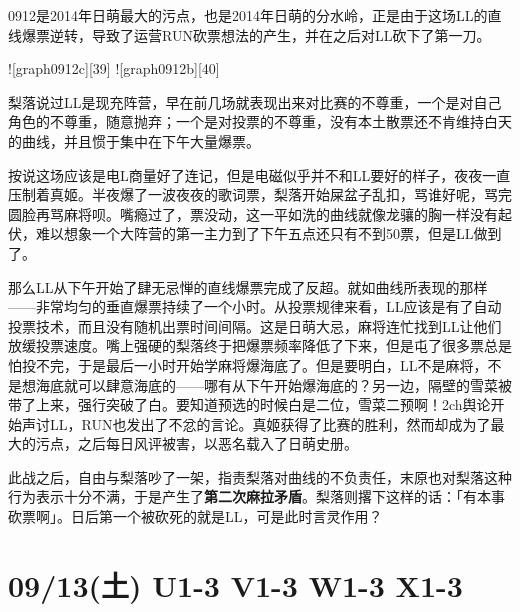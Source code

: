 0912是2014年日萌最大的污点，也是2014年日萌的分水岭，正是由于这场LL的直线爆票逆转，导致了运营RUN砍票想法的产生，并在之后对LL砍下了第一刀。

![graph0912c][39]
![graph0912b][40]

梨落说过LL是现充阵营，早在前几场就表现出来对比赛的不尊重，一个是对自己角色的不尊重，随意抛弃；一个是对投票的不尊重，没有本土散票还不肯维持白天的曲线，并且惯于集中在下午大量爆票。

按说这场应该是电L商量好了连记，但是电磁似乎并不和LL要好的样子，夜夜一直压制着真姬。半夜爆了一波夜夜的歌词票，梨落开始屎盆子乱扣，骂谁好呢，骂完圆脸再骂麻将呗。嘴瘾过了，票没动，这一平如洗的曲线就像龙骧的胸一样没有起伏，难以想象一个大阵营的第一主力到了下午五点还只有不到50票，但是LL做到了。

那么LL从下午开始了肆无忌惮的直线爆票完成了反超。就如曲线所表现的那样——非常均匀的垂直爆票持续了一个小时。从投票规律来看，LL应该是有了自动投票技术，而且没有随机出票时间间隔。这是日萌大忌，麻将连忙找到LL让他们放缓投票速度。嘴上强硬的梨落终于把爆票频率降低了下来，但是屯了很多票总是怕投不完，于是最后一小时开始学麻将爆海底了。但是要明白，LL不是麻将，不是想海底就可以肆意海底的——哪有从下午开始爆海底的？另一边，隔壁的雪菜被带了上来，强行突破了白。要知道预选的时候白是二位，雪菜二预啊！2ch舆论开始声讨LL，RUN也发出了不忿的言论。真姬获得了比赛的胜利，然而却成为了最大的污点，之后每日风评被害，以恶名载入了日萌史册。

此战之后，自由与梨落吵了一架，指责梨落对曲线的不负责任，末原也对梨落这种行为表示十分不满，于是产生了\textbf{第二次麻拉矛盾}。梨落则撂下这样的话：「有本事砍票啊」。日后第一个被砍死的就是LL，可是此时言灵作用？

\section{09/13(土) U1-3 V1-3 W1-3 X1-3}


